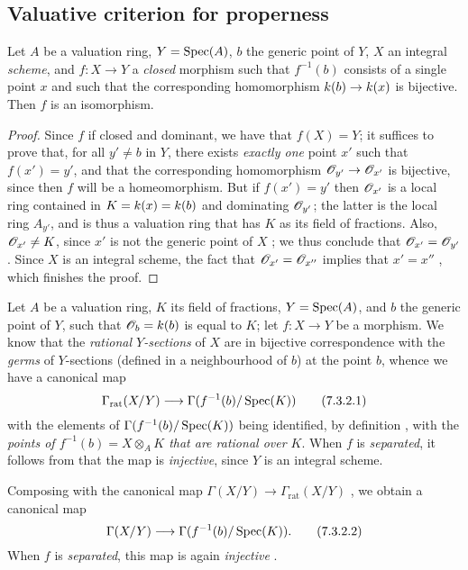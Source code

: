
\subsection{Valuative criterion for properness}
\label{subsection:II.7.3}

\begin{proposition}[7.3.1]
\label{II.7.3.1}
Let $A$ be a valuation ring, $Y=\operatorname{Spec}(A)$, $b$ the generic point of $Y$, $X$ an integral \emph{scheme}, and $f:X\to Y$ a \emph{closed} morphism such that $f^{-1}(b)$ consists of a single point $x$ and such that the corresponding homomorphism $\kres(b)\to\kres(x)$ is bijective.
Then $f$ is an isomorphism.
\end{proposition}

\begin{proof}
\label{proof-II.7.3.1}
Since $f$ if closed and dominant, we have that $f(X)=Y$;
it suffices  to prove that, for all $y'\neq b$ in $Y$, there exists \emph{exactly one} point $x'$ such that $f(x')=y'$, and that the corresponding homomorphism $\sh{O}_{y'}\to\sh{O}_{x'}$ is bijective, since then $f$ will be a homeomorphism.
But if $f(x')=y'$ then $\mathscr{O}_{x'}$ is a local ring contained in $K=k(x)=k(b)$ and dominating $\mathscr{O}_{y'}$;
the latter is the local ring $A_{y'}$, and is thus a valuation ring  that has $K$ as its field of fractions.
Also, $\mathscr{O}_{x'}\neq K$, since $x'$ is not the generic point of $X$ ;
we thus conclude that $\mathscr{O}_{x'}=\mathscr{O}_{y'}$.
Since $X$ is an integral scheme, the fact that $\mathscr{O}_{x'}=\mathscr{O}_{x''}$ implies that $x'=x''$ , which finishes the proof.
\end{proof}

\begin{env}[7.3.2]
\label{II.7.3.2}
Let $A$ be a valuation ring, $K$ its field of fractions, $Y=\operatorname{Spec}(A)$, and $b$ the generic point of $Y$, such that $\mathscr{O}_b=k(b)$ is equal to $K$;
let $f:X\to Y$ be a morphism.
We know  that the \emph{rational $Y$-sections} of $X$ are in bijective correspondence with the \emph{germs} of $Y$-sections (defined in a neighbourhood of $b$) at the point $b$, whence we have a canonical map
\[
\label{II.7.3.2.1}
    \Gamma_\mathrm{rat}(X/Y) \to \Gamma(f^{-1}(b)/\Spec(K))
\tag{7.3.2.1}
\]
with the elements of $\Gamma(f^{-1}(b)/\operatorname{Spec}(K))$ being identified, by definition , with the \emph{points of $f^{-1}(b)=X\otimes_A K$ that are rational over $K$}.
When $f$ is \emph{separated}, it follows from  that the map  is \emph{injective}, since $Y$ is an integral scheme.

Composing  with the canonical map $\Gamma(X/Y)\to\Gamma_\mathrm{rat}(X/Y)$ , we obtain a canonical map
\[
\label{II.7.3.2.2}
    \Gamma(X/Y) \to \Gamma(f^{-1}(b)/\Spec(K)).
\tag{7.3.2.2}
\]
When $f$ is \emph{separated}, this map is again \emph{injective} .
\end{env}

